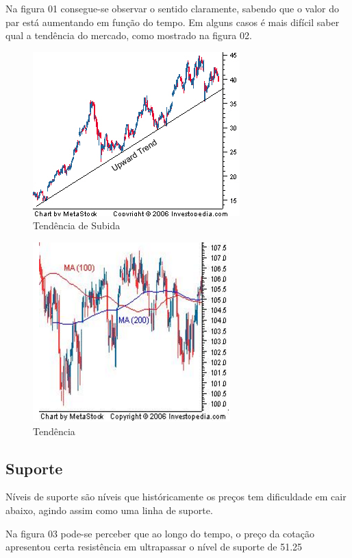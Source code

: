 Na figura 01 consegue-se observar o sentido claramente, sabendo que o valor do par está aumentando em função do tempo.
Em alguns casos é mais difícil saber qual a tendência do mercado, como mostrado na figura 02.

\begin{figure}[h]
	\centering
	\includegraphics[keepaspectratio=true,scale=1]{figuras/up.png}
	\caption{Tendência de Subida}
	\label{fig01}
\end{figure}

\begin{figure}[h]
	\centering
	\includegraphics[keepaspectratio=true,scale=1]{figuras/flat.png}
	\caption{Tendência}
	\label{fig02}
\end{figure}


\subsection{Suporte}

Níveis de suporte são níveis que históricamente os preços tem dificuldade em cair abaixo, agindo assim como uma linha de suporte.

Na figura 03 pode-se perceber que ao longo do tempo, o preço da cotação apresentou certa resistência em ultrapassar o nível de suporte de 51.25

